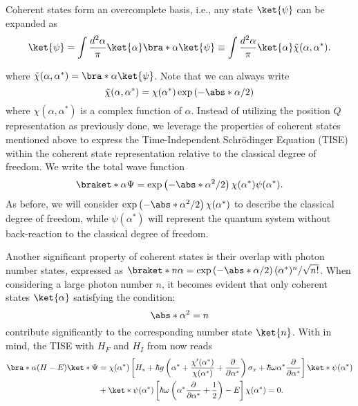 Coherent states form an overcomplete basis, i.e., any state \(\ket{\psi}\) can be expanded as
\begin{equation}
    \label{eq:class_jcm_eq20}
    \ket{\psi} = \int \frac{d^2\alpha}{\pi} \ket{\alpha}\bra*{\alpha}\ket{\psi} \equiv 
    \int \frac{d^2\alpha}{\pi} \ket{\alpha}\Tilde{\chi}(\alpha, \alpha^*).
\end{equation}

where \(\Tilde{\chi}(\alpha, \alpha^*) = \bra*{\alpha}\ket{\psi}\). Note that we can 
always write  
\[\Tilde{\chi}(\alpha, \alpha^*) = \chi(\alpha^*)\exp\left(-\abs*{\alpha}/2\right)\]
where \(\chi(\alpha, \alpha^*)\) is a complex function of \(\alpha\). Instead of utilizing the position
$Q$ representation as previously done, we leverage the properties of coherent states mentioned 
above to express the Time-Independent Schrödinger Equation (TISE) within the coherent state 
representation relative to the classical degree of freedom. We write the total wave function
\begin{equation}
    \label{eq:class_jcm_eq21}
    \braket*{\alpha}{\Psi} = \exp\left(-\abs*{\alpha}^2/2\right)\chi(\alpha^*)\psi(\alpha^*).
\end{equation}
As before, we will consider \( \exp\left(-\abs*{\alpha}^2/2\right)\chi(\alpha^*)\) to 
describe the classical degree of freedom, while \(\psi(\alpha^*)\) will represent the 
quantum system without back-reaction to the classical degree of freedom.

Another significant property of coherent states is their overlap with photon number states, expressed as 
\( \braket*{n}{\alpha} = \exp\left(-\abs*{\alpha}/2\right) (\alpha^*)^n/\sqrt{n!} \). 
When considering a large photon number $n$, it becomes evident that only coherent states 
$\ket{\alpha}$ satisfying the condition:
\begin{equation}
\label{eq:class_jcm_eq22}
\abs*{\alpha}^2 = n
\end{equation}
contribute significantly to the corresponding number state \(\ket{n}\). 
With  in mind, the TISE with $H_F$ and $H_I$ from 
 now reads
\begin{align}
    \label{eq:class_jcm_eq23}
    \bra*{\alpha}(H - E)\ket*{\Psi} &= \chi(\alpha^*)
    \left[H_s + \hbar g \left(\alpha ^* + 
    \frac{\chi'(\alpha^*)}{\chi(\alpha^*)} + \dfrac{\partial}{\partial \alpha^*}
    \right)\sigma_x + \hbar \omega \alpha^* \dfrac{\partial}{\partial \alpha^*}\right] 
    \ket*{\psi(\alpha^*)} \nonumber \\
    &+ \ket*{\psi(\alpha^*)}
    \left[\hbar \omega \left(
        \alpha^* \dfrac{\partial}{\partial \alpha^*} + \frac{1}{2}\right) - E\right]\chi(\alpha^*) = 0. \quad \qquad
\end{align}

